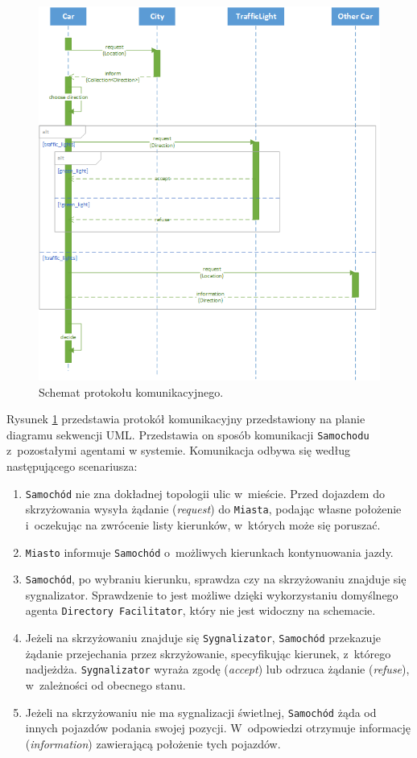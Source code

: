 \documentclass[11pt,a4paper]{article}
\begin{document}
\begin{figure}[ht]
    \centering
    \includegraphics[width=.9\textwidth]{protocol.png}
    \caption{Schemat protokołu komunikacyjnego.}
    \label{fig:protocol}
\end{figure}

Rysunek \ref{fig:protocol} przedstawia protokół komunikacyjny przedstawiony na planie diagramu sekwencji UML. Przedstawia on sposób komunikacji \verb+Samochodu+ z~pozostałymi agentami w systemie. Komunikacja odbywa się według następującego scenariusza:

\begin{enumerate}
    \item \verb+Samochód+ nie zna dokładnej topologii ulic w~mieście. Przed dojazdem do skrzyżowania wysyła żądanie (\emph{request}) do \verb+Miasta+, podając własne położenie i~oczekując na zwrócenie listy kierunków, w~których może się poruszać.
    \item \verb+Miasto+ informuje \verb+Samochód+ o~możliwych kierunkach kontynuowania jazdy. 
    \item \verb+Samochód+, po wybraniu kierunku, sprawdza czy na skrzyżowaniu znajduje się sygnalizator. Sprawdzenie to jest możliwe dzięki wykorzystaniu domyślnego agenta \verb+Directory Facilitator+, który nie jest widoczny na schemacie.
    \item Jeżeli na skrzyżowaniu znajduje się \verb+Sygnalizator+, \verb+Samochód+ przekazuje żądanie przejechania przez skrzyżowanie, specyfikując kierunek, z~którego nadjeżdża. \verb+Sygnalizator+ wyraża zgodę (\emph{accept}) lub odrzuca żądanie (\emph{refuse}), w~zależności od obecnego stanu. 
    \item Jeżeli na skrzyżowaniu nie ma sygnalizacji świetlnej, \verb+Samochód+ żąda od innych pojazdów podania swojej pozycji. W~odpowiedzi otrzymuje informację (\emph{information}) zawierającą położenie tych pojazdów.
\end{enumerate}
\end{document}
